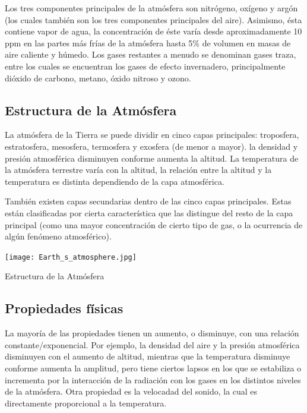 \documentclass{article}
\begin{document}
Los tres componentes principales de la atmósfera son nitrógeno, oxígeno y argón (los cuales también son los tres componentes principales del aire). Asimismo, ésta contiene vapor de agua, la concentración de éste varía desde aproximadamente 10 ppm en las partes más frías de la atmósfera hasta 5\% de volumen en masas de aire caliente y húmedo. Los gases restantes a menudo se denominan gases traza, entre los cuales se encuentran los gases de efecto invernadero, principalmente dióxido de carbono, metano, óxido nitroso y ozono.

\subsection{Estructura de la Atmósfera}

La atmósfera de la Tierra se puede dividir en cinco capas principales: troposfera, estratosfera, mesosfera, termosfera y exosfera (de menor a mayor).
la densidad y presión atmosférica disminuyen conforme aumenta la altitud. La temperatura de la atmósfera terrestre varía con la altitud, la relación entre la altitud y la temperatura es distinta dependiendo de la capa atmosférica.

También existen capas secundarias dentro de las cinco capas principales. Estas están clasificadas por cierta característica que las distingue del resto de la capa principal (como una mayor concentración de cierto tipo de gas, o la ocurrencia de algún fenómeno atmosférico).

\vspace{0.5cm}

\begin{center}
	\texttt{[image: Earth\_s\_atmosphere.jpg]}
    
    Estructura de la Atmósfera
\end{center}

\subsection{Propiedades físicas}

La mayoría de las propiedades tienen un aumento, o disminuye, con una relación constante/exponencial. Por ejemplo, la densidad del aire y la presión atmosférica disminuyen con el aumento de altitud, mientras que la temperatura disminuye conforme aumenta la amplitud, pero tiene ciertos lapsos en los que se estabiliza o incrementa por la interacción de la radiación con los gases en los distintos niveles de la atmósfera. Otra propiedad es la velocadad del sonido, la cual es directamente proporcional a la temperatura.
\end{document}
